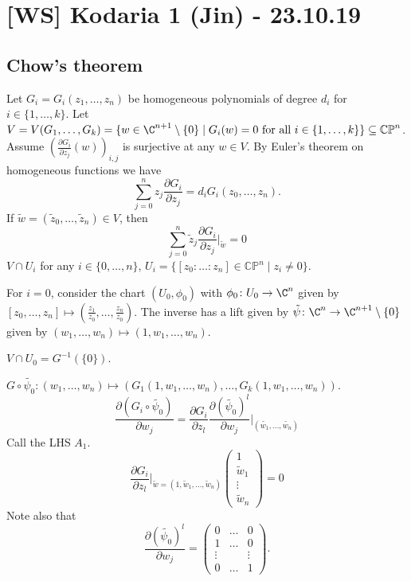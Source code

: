 \documentclass[A4paper, british]{amsart}
\theoremstyle{darkgreentheorem}
\theoremstyle{darkbluedefinition}
\theoremstyle{darkredexample}
\theoremstyle{remark}
\newcommand{\CP}{\mathbb{CP}}
\newcommand{\1}{\mathbbm{1}}
\begin{document}
\section{[WS] Kodaria 1 (Jin) - 23.10.19}

\subsection{Chow's theorem}

Let $G_{i}=G_{i}(z_{1},\ldots,z_{n})$ be homogeneous polynomials of degree $d_{i}$ for $i\in \{1,\ldots,k\}$.
Let $V=V(G_{1},\ldots,G_{k})=\{w\in \C^{n+1}\setminus \{0 \}\mid G_{i}(w)=0 \text{ for all }i\in \{1,\ldots,k\}\}\subseteq \CP^{n}$.
Assume $(\frac{\partial G_{i}}{\partial z_{j}}(w))_{i,j}$ is surjective at any $w\in V$.
By Euler's theorem on homogeneous functions we have
\[ \sum_{j=0}^{n}z_{j}\frac{\partial G_{i}}{\partial z_{j}}=d_{i}G_{i}(z_{0},\ldots,z_{n}). \]
If $\tilde{w}=(\tilde{z}_{0},\ldots,\tilde{z}_{n})\in V$, then
\[ \sum_{j=0}^{n}\tilde{z}_{j}\frac{\partial G_{i}}{\partial z_{j}}|_{\tilde{w}}=0\]
$V\cap U_{i}$ for any $i\in \{0,\ldots,n\}$, $U_{i}=\{[z_{0}:\ldots:z_{n}]\in \CP^{n}\mid z_{i}\neq 0\}$.

For $i=0$, consider the chart $(U_{0},\phi_{0})$ with $\phi_{0}\colon U_{0}\to \C^{n}$ given by $[z_{0},\ldots,z_{n}]\mapsto (\frac{z_{1}}{z_{0}},\ldots,\frac{z_{n}}{z_{0}})$.
The inverse has a lift given by $\tilde{\psi}\colon \C^{n}\to \C^{n+1}\setminus \{0\}$ given by $(w_{1},\ldots,w_{n})\mapsto (1,w_{1},\ldots,w_{n})$.
\begin{center}
\end{center}
$V\cap U_{0}=G^{-1}(\{0\})$.

$G\circ \tilde{\psi_{0}}\colon (w_{1},\ldots,w_{n})\mapsto (G_{1}(1,w_{1},\ldots,w_{n}),\ldots,G_{k}(1,w_{1},\ldots,w_{n}))$.
\[ \frac{\partial (G_{i}\circ \tilde{\psi_{0}})}{\partial w_{j}} = \frac{\partial G_{i}}{\partial z_{l}}\frac{\partial(\tilde{\psi_{0}})^{l}}{\partial w_{j}}|_{(\tilde{w_{1}},\ldots,\tilde{w_{n}})} \]
Call the LHS $A_{1}$.
\begin{equation}
    \frac{\partial G_{i}}{\partial z_{l}}|_{\tilde{w}=(1,\tilde{w}_{1},\ldots,\tilde{w}_{n})}\begin{pmatrix} 1 \\ \tilde{w}_{1} \\ \vdots \\ \tilde{w}_{n} \end{pmatrix} = 0
\end{equation}
Note also that
\[\frac{\partial (\tilde{\psi_{0}})^{l}}{\partial w_{j}}=\begin{pmatrix} 0 & \ldots & 0 \\ 1 & \ldots & 0\\ \vdots & & \vdots \\ 0 & \ldots & 1 \end{pmatrix}.\]
\end{document}
